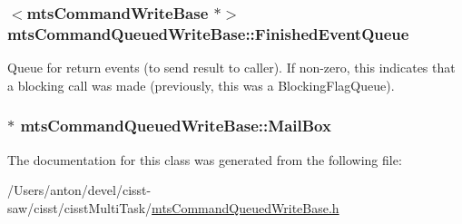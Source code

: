 \subsubsection[{Finished\+Event\+Queue}]{$<${\bf mts\+Command\+Write\+Base} $\ast$$>$ mts\+Command\+Queued\+Write\+Base\+::\+Finished\+Event\+Queue\hspace{0.3cm}{\ttfamily [protected]}}\label{classmts_command_queued_write_base_a67c11afa021916f995d1d537312c9a4c}
Queue for return events (to send result to caller). If non-\/zero, this indicates that a blocking call was made (previously, this was a Blocking\+Flag\+Queue). \hypertarget{classmts_command_queued_write_base_aff12f0b8e184ae4891388a5c0c647724}{}
\subsubsection[{Mail\+Box}]{$\ast$ mts\+Command\+Queued\+Write\+Base\+::\+Mail\+Box\hspace{0.3cm}{\ttfamily [protected]}}\label{classmts_command_queued_write_base_aff12f0b8e184ae4891388a5c0c647724}


The documentation for this class was generated from the following file\+:\begin{DoxyCompactItemize}
\item 
/\+Users/anton/devel/cisst-\/saw/cisst/cisst\+Multi\+Task/\hyperlink{mts_command_queued_write_base_8h}{mts\+Command\+Queued\+Write\+Base.\+h}\end{DoxyCompactItemize}
